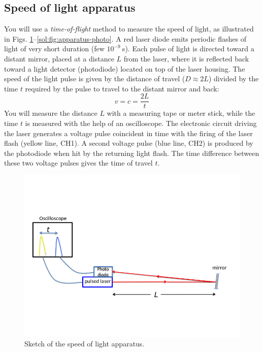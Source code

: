 \subsection{Speed of light apparatus}

You will use a \textit{time-of-flight} method to measure the speed of light, as illustrated in Figs. \ref{sol:fig:apparatus-sketch}--\ref{sol:fig:apparatus-photo}.  A red laser diode emits periodic flashes of light of very short duration (few $10^{-9}\:$s).  Each pulse of light is directed toward a distant mirror, placed at a distance $L$ from the laser, where it is reflected back toward a light detector (photodiode) located on top of the laser housing. The speed of the light pulse is given by the distance of travel ($D\approx 2L$) divided by the time $t$ required by the pulse to travel to the distant mirror and back:
\begin{equation}\label{sol:eqn:dvt}
v = c = \frac{2L}{t}
\end{equation}
You will measure the distance $L$ with a measuring tape or meter stick, while the time $t$ is measured with the help of an oscilloscope. The electronic circuit driving the laser generates a voltage pulse coincident in time with the firing of the laser flash (yellow line, CH1). A second voltage pulse (blue line, CH2) is produced by the photodiode when hit by the returning light flash. The time difference between these two voltage pulses gives the time of travel $t$.

\begin{figure}
	\centering
	\includegraphics[width=\textwidth]{speed-of-light/apparatus-sketch.png}
	\caption{Sketch of the speed of light apparatus.}\label{sol:fig:apparatus-sketch}
\end{figure}

